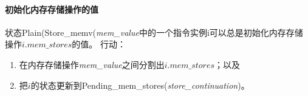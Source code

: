 \paragraph{初始化内存存储操作的值}\label{omm:instantiate_store_value}
状态{\sc Plain}({\sc Store\_memv}({\it mem\_value}中的一个指令实例i可以总是初始化内存存储操作$i.\textit{mem\_stores}$的值。
行动：
\begin{enumerate}
\item 在内存存储操作{\it mem\_value}之间分割出$i.\textit{mem\_stores}$；以及 %
\item 把$i$的状态更新到{\sc Pending\_mem\_stores}({\it store\_continuation})。 %
\end{enumerate}


